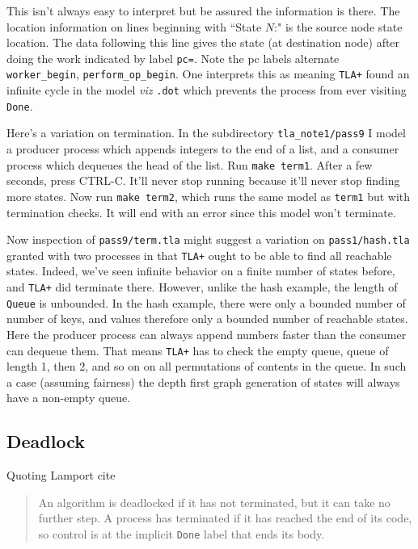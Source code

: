 \documentclass[twocolumn]{article}
\begin{document}
This isn't always easy to interpret but be assured the information is there. The location information on lines beginning with ``State $N$:" is the source node state location. The data following this line gives the state (at destination node) after doing the work indicated by label \texttt{pc=}. Note the pc labels alternate \texttt{worker\_begin}, \texttt{perform\_op\_begin}. One interprets this as meaning \texttt{TLA+} found an infinite cycle in the model \emph{viz} \texttt{.dot} which prevents the process from ever visiting \texttt{Done}.

Here's a variation on termination. In the subdirectory \texttt{tla\_note1/pass9} I model a producer process which appends integers to the end of a list, and a consumer process which dequeues the head of the list. Run \texttt{make term1}. After a few seconds, press CTRL-C. It'll never stop running because it'll never stop finding more states. Now run \texttt{make term2}, which runs the same model as \texttt{term1} but with termination checks. It will end with an error since this model won't terminate. 

Now inspection of \texttt{pass9/term.tla} might suggest a variation on \texttt{pass1/hash.tla} granted with two processes in that \texttt{TLA+} ought to be able to find all reachable states. Indeed, we've seen infinite behavior on a finite number of states before, and \texttt{TLA+} did terminate there. However, unlike the hash example, the length of \texttt{Queue} is unbounded. In the hash example, there were only a bounded number of number of keys, and values therefore only a bounded number of reachable states. Here the producer process can always append numbers faster than the consumer can dequeue them. That means \texttt{TLA+} has to check the empty queue, queue of length 1, then 2, and so on on all permutations of contents in the queue. In such a case (assuming fairness) the depth first graph generation of states will always have a non-empty queue.

\subsection{Deadlock}
Quoting Lamport cite

\begin{quote} An algorithm is deadlocked if it has not terminated, but it can take no further step. A process has terminated if it has reached the end of its code, so control is at the implicit \texttt{Done} label that ends its body.
\end{quote}
\end{document}
